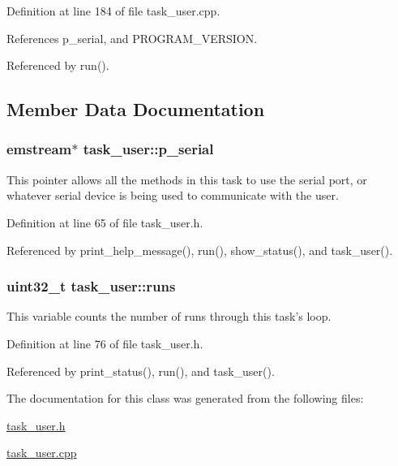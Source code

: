 \-Definition at line 184 of file task\-\_\-user.\-cpp.



\-References p\-\_\-serial, and \-P\-R\-O\-G\-R\-A\-M\-\_\-\-V\-E\-R\-S\-I\-O\-N.



\-Referenced by run().



\subsection{\-Member \-Data \-Documentation}
\hypertarget{classtask__user_a04ed5c2b4d7c9a1530bde6f217e01681}{
\subsubsection[{p\-\_\-serial}]{\setlength{\rightskip}{0pt plus 5cm}emstream$\ast$ {\bf task\-\_\-user\-::p\-\_\-serial}}}\label{classtask__user_a04ed5c2b4d7c9a1530bde6f217e01681}
\-This pointer allows all the methods in this task to use the serial port, or whatever serial device is being used to communicate with the user. 

\-Definition at line 65 of file task\-\_\-user.\-h.



\-Referenced by print\-\_\-help\-\_\-message(), run(), show\-\_\-status(), and task\-\_\-user().

\hypertarget{classtask__user_ac85973422902084fc9a4692250be32fe}{
\subsubsection[{runs}]{\setlength{\rightskip}{0pt plus 5cm}uint32\-\_\-t {\bf task\-\_\-user\-::runs}}}\label{classtask__user_ac85973422902084fc9a4692250be32fe}
\-This variable counts the number of runs through this task's loop. 

\-Definition at line 76 of file task\-\_\-user.\-h.



\-Referenced by print\-\_\-status(), run(), and task\-\_\-user().



\-The documentation for this class was generated from the following files\-:\begin{DoxyCompactItemize}
\item 
\hyperlink{task__user_8h}{task\-\_\-user.\-h}\item 
\hyperlink{task__user_8cpp}{task\-\_\-user.\-cpp}\end{DoxyCompactItemize}
